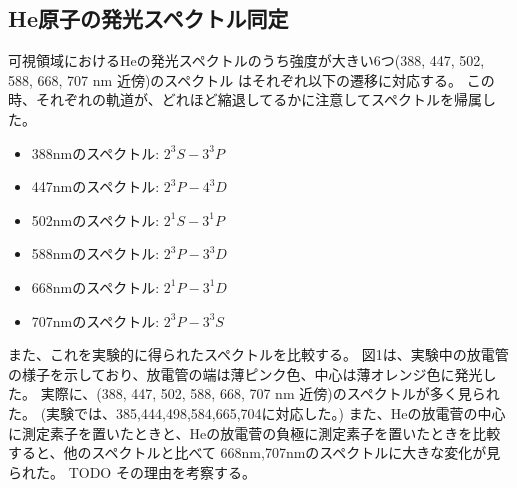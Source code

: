 \documentclass[a4j,twocolumn]{jsarticle}
\begin{document}
\subsection*{He原子の発光スペクトル同定}

可視領域におけるHeの発光スペクトルのうち強度が大きい6つ(388, 447, 502, 588, 668, 707 nm 近傍)のスペクトル
はそれぞれ以下の遷移に対応する。
この時、それぞれの軌道が、どれほど縮退してるかに注意してスペクトルを帰属した。

\begin{itemize}
    \item 388nmのスペクトル: $2^3S-3^3P$
    \item 447nmのスペクトル: $2^3P-4^3D$
    \item 502nmのスペクトル: $2^1S-3^1P$
    \item 588nmのスペクトル: $2^3P-3^3D$
    \item 668nmのスペクトル: $2^1P-3^1D$
    \item 707nmのスペクトル: $2^3P-3^3S$
\end{itemize}

また、これを実験的に得られたスペクトルを比較する。
図1は、実験中の放電管の様子を示しており、放電管の端は薄ピンク色、中心は薄オレンジ色に発光した。
実際に、(388, 447, 502, 588, 668, 707 nm 近傍)のスペクトルが多く見られた。
(実験では、385,444,498,584,665,704に対応した。)
また、Heの放電菅の中心に測定素子を置いたときと、Heの放電菅の負極に測定素子を置いたときを比較すると、他のスペクトルと比べて
668nm,707nmのスペクトルに大きな変化が見られた。
TODO その理由を考察する。
\end{document}
